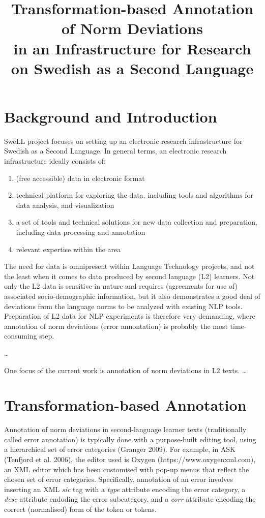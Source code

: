 \documentclass[10pt, a4paper]{article}
\title{Transformation-based Annotation of Norm Deviations \\ in an Infrastructure for Research on Swedish as a Second Language}
\begin{document}
\maketitleabstract

\section{Background and Introduction}

SweLL project focuses on setting up an electronic research infrastructure for Swedish as a Second Language. In general terms, an electronic research infrastructure ideally consists of:
\begin{enumerate}
\item  (free accessible) data in electronic format
\item  technical platform for exploring the data, including tools and algorithms for data analysis,  and visualization
\item a set of tools and technical solutions for new data collection and preparation, including data processing and annotation
\item  relevant expertise within the area
\end{enumerate}


The need for data is omnipresent within Language Technology projects, and not the least when it comes to data produced by second language (L2) learners. Not only the L2 data is sensitive in nature and requires (agreements for use of) associated socio-demographic information, but it also demonstrates a good deal of deviations from the language norms to be analyzed with existing NLP tools. Preparation of L2 data for NLP experiments is therefore very demanding, where annotation of norm deviations (error annontation) is probably the most time-consuming step. 

 \ldots
 
One focus of the current work is annotation of norm deviations in L2 texts. \ldots

\section{Transformation-based Annotation}

Annotation of norm deviations in second-language learner texts (traditionally called error annotation) is typically done with a purpose-built editing tool, using a hierarchical set of error categories (Granger 2009). For example, in ASK (Tenfjord et al. 2006), the editor used is Oxygen (https://www.oxygenxml.com), an XML editor which has been customised with pop-up menus that reflect the chosen set of error categories. Specifically, annotation of an error involves inserting an XML {\em sic} tag with a {\em type} attribute encoding the error category, a {\em desc} attribute endoding the error subcategory, and a {\em corr} attribute encoding the correct (normalised) form of the token or tokens.
\end{document}
